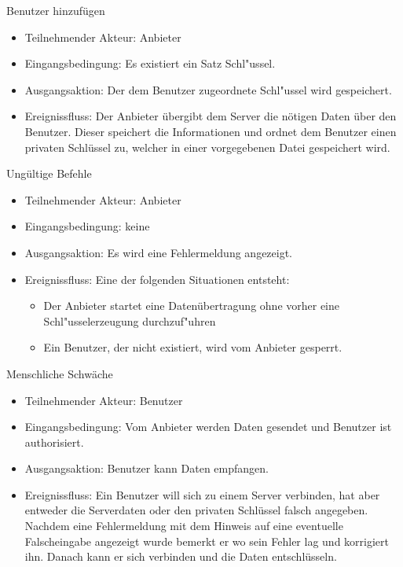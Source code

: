 \documentclass[a4paper,10pt]{scrartcl}
\begin{document}
\begin{usecase}

 {Benutzer hinzufügen
   \begin{itemize}
   \item Teilnehmender Akteur: Anbieter
   \item Eingangsbedingung: Es existiert ein Satz Schl"ussel.
   \item Ausgangsaktion: Der dem Benutzer zugeordnete Schl"ussel wird gespeichert.
   \item Ereignissfluss: Der Anbieter übergibt dem Server die nötigen Daten über den Benutzer.
         Dieser speichert die Informationen und ordnet dem Benutzer einen privaten Schlüssel
         zu, welcher in einer vorgegebenen Datei gespeichert wird.
   \end{itemize}
}

 {Ungültige Befehle
   \begin{itemize}
   \item Teilnehmender Akteur: Anbieter
   \item Eingangsbedingung: keine
   \item Ausgangsaktion: Es wird eine Fehlermeldung angezeigt.
   \item Ereignissfluss:
          Eine der folgenden Situationen entsteht:
          \begin{itemize}
           \item Der Anbieter startet eine Datenübertragung ohne vorher eine Schl"usselerzeugung
                 durchzuf"uhren
           \item Ein Benutzer, der nicht existiert, wird vom Anbieter gesperrt.
           \end{itemize}
   \end{itemize}
}
 {Menschliche Schwäche
   \begin{itemize}
   \item Teilnehmender Akteur: Benutzer
   \item Eingangsbedingung: Vom Anbieter werden Daten gesendet und Benutzer ist authorisiert.
   \item Ausgangsaktion: Benutzer kann Daten empfangen.
   \item Ereignissfluss: Ein Benutzer will sich zu einem Server verbinden, hat aber entweder
             die Serverdaten oder den privaten Schlüssel falsch angegeben. Nachdem eine
             Fehlermeldung mit dem Hinweis auf eine eventuelle Falscheingabe angezeigt wurde
             bemerkt er wo sein Fehler lag und korrigiert ihn. Danach kann er sich verbinden
             und die Daten entschlüsseln.
   \end{itemize}
}
\end{usecase}
\end{document}
